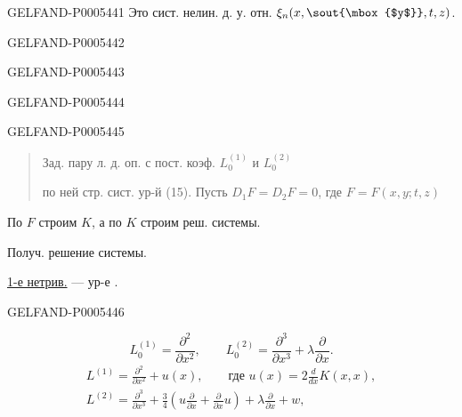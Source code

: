 \begin{GelfandAdjacentEvidence}{GELFAND-P000544}{1}
Это сист. нелин. д. у. отн. \(\xi_n(x,\text{\sout{\mbox{$y$}}},t,z)\).
\end{GelfandAdjacentEvidence}
\begin{GelfandAdjacentEvidence}{GELFAND-P000544}{2}

\end{GelfandAdjacentEvidence}
\begin{GelfandAdjacentEvidence}{GELFAND-P000544}{3}


\qquad
{}
\end{GelfandAdjacentEvidence}
\begin{GelfandAdjacentEvidence}{GELFAND-P000544}{4}

\end{GelfandAdjacentEvidence}
\begin{GelfandAdjacentEvidence}{GELFAND-P000544}{5}


\begin{quote}
Зад. пару л. д. оп. с пост. коэф. \(L_0^{(1)}\) и \(L_0^{(2)}\)

по ней стр. сист. ур-й (15). Пусть \(D_1F=D_2F=0\),
где \(F=F(x,y;t,z)\)
\end{quote}
По \(F\) строим \(K\), а по \(K\) строим реш. системы.

Получ. решение системы.

\uline{1-е нетрив.} — ур-е .
\end{GelfandAdjacentEvidence}
\begin{GelfandAdjacentEvidence}{GELFAND-P000544}{6}

\[
L_0^{(1)}=\frac{\partial^2}{\partial x^2},\qquad
L_0^{(2)}=\frac{\partial^3}{\partial x^3}+\lambda\frac{\partial}{\partial x}.
\]
\begin{gather*}
L^{(1)}=\frac{\partial^2}{\partial x^2}+u(x),\qquad
\text{где } u(x)=2\frac d{dx}K(x,x),\\
L^{(2)}=\frac{\partial^3}{\partial x^3}
+\frac34\left(u\frac{\partial}{\partial x}+\frac{\partial}{\partial x}u\right)
+\lambda\frac{\partial}{\partial x}+w,
\end{gather*}
\end{GelfandAdjacentEvidence}
